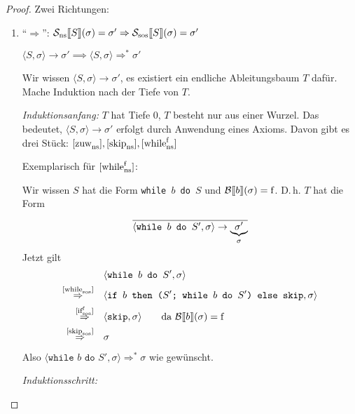 \begin{proof}
    Zwei Richtungen:
    \begin{enumerate}
        \item ``$\Rightarrow$'': $\mathcal{S_{\text{ns}}}\lsem S \rsem(\sigma) = \sigma' \Rightarrow \mathcal{S_{\text{sos}}}\lsem S \rsem(\sigma) = \sigma'$

            \dh{} $\langle S, \sigma \rangle \to \sigma' \implies \langle S, \sigma \rangle \Rightarrow^* \sigma'$

            Wir wissen $\langle S, \sigma \rangle \to \sigma'$, \dh{} es existiert ein endliche Ableitungsbaum $T$ dafür. Mache Induktion nach der Tiefe von $T$.

            \par\medskip
            \emph{Induktionsanfang:} $T$ hat Tiefe 0, \dh{} $T$ besteht nur aus einer Wurzel. Das bedeutet, $\langle S, \sigma \rangle \to \sigma'$ erfolgt durch Anwendung eines Axioms. Davon gibt es drei Stück: $\infruleNs{zuw}, \infruleNs{skip}, \infruleNs[\false]{while}$

            Exemplarisch für $\infruleNs[\false]{while}$:

            Wir wissen $S$ hat die Form \texttt{while $b$ do $S$} und $\Bsem{b}(\sigma) = \false$. D.\,h. $T$ hat die Form
            \[
                \frac{}{
                    \strans{\texttt{while $b$ do $S'$}}{\sigma}{\underbrace{\sigma'}_{\sigma}}
                }
            \]
            Jetzt gilt
            \begin{align*}
                & \langle \texttt{while $b$ do $S'$}, \sigma \rangle \\
                \overset{\infruleSos[]{while}}{\Rightarrow} \quad & \langle \texttt{if $b$ then ($S'$; while $b$ do $S'$) else skip} , \sigma \rangle \\
                \overset{\infruleSos[\false]{if}}{\Rightarrow} \quad & \langle \texttt{skip}, \sigma \rangle \quad\quad \text{da } \Bsem{b}(\sigma) = \false \\
                \overset{\infruleSos{skip}}{\Rightarrow} \quad & \sigma \\
            \end{align*}
            Also $\langle \texttt{while $b$ do $S'$}, \sigma \rangle \Rightarrow^* \sigma$ wie gewünscht.

            \par\bigskip
            \emph{Induktionsschritt:}

    \end{enumerate}
\end{proof}